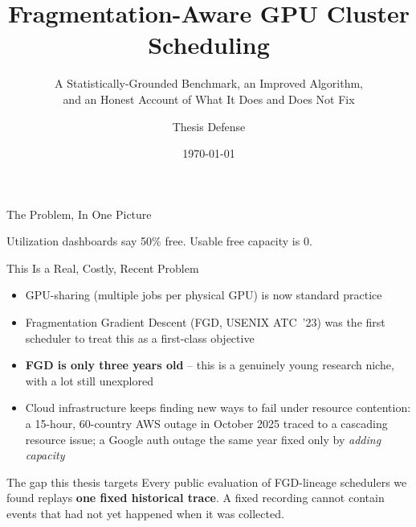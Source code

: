 \documentclass[aspectratio=169]{beamer}
\title[Fragmentation-Aware GPU Scheduling]{Fragmentation-Aware GPU Cluster Scheduling}
\subtitle{A Statistically-Grounded Benchmark, an Improved Algorithm,\\ and an Honest Account of What It Does and Does Not Fix}
\author{Thesis Defense}
\institute{gputrace + py\_sim}
\date{\today}
\begin{document}
\begin{frame}
\titlepage
\end{frame}

\begin{frame}{The Problem, In One Picture}
\centering
{}

\vspace{0.6cm}
\begin{center}
\alert{Utilization dashboards say 50\% free. Usable free capacity is 0.}
\end{center}
\end{frame}

\begin{frame}{This Is a Real, Costly, Recent Problem}
\begin{itemize}
  \item GPU-sharing (multiple jobs per physical GPU) is now standard practice
  \item Fragmentation Gradient Descent (FGD, USENIX ATC~'23) was the first
    scheduler to treat this as a first-class objective
  \item \textbf{FGD is only three years old} -- this is a genuinely young
    research niche, with a lot still unexplored
  \item Cloud infrastructure keeps finding new ways to fail under resource
    contention: a 15-hour, 60-country AWS outage in October 2025 traced to
    a cascading resource issue; a Google auth outage the same year fixed
    only by \emph{adding capacity}
\end{itemize}
\vspace{0.4cm}
\begin{alertblock}{The gap this thesis targets}
Every public evaluation of FGD-lineage schedulers we found replays
\textbf{one fixed historical trace}. A fixed recording cannot contain
events that had not yet happened when it was collected.
\end{alertblock}
\end{frame}
\end{document}
